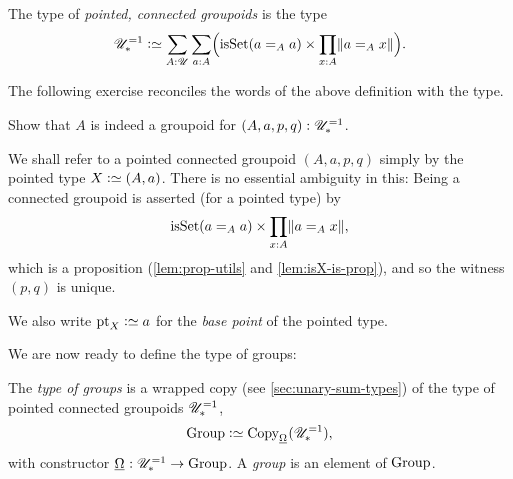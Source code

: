 \begin{definition}\label{def:pt-conn-groupoid}
  The type of \emph{pointed, connected groupoids} is the type
  \[
    \UUscone \defeq \sum_{A:\UU}\sum_{a:A} \Bigl(\isset(a=_Aa)
    \times \prod_{x:A}\Trunc{a=_Ax}\Bigr).
  \]
\end{definition}
The following exercise reconciles the words of the above definition with the type.
\begin{xca}\label{xca:defgroup}
  Show that $A$ is indeed a groupoid for $(A,a,p,q):{\mathscr{U}}_\ast^{=1}$.
\end{xca}
\begin{remark}
  We shall refer to a pointed connected groupoid $(A,a,p,q)$ simply
  by the pointed type $X \defeq (A,a)$.
  There is no essential ambiguity in this:
  Being a connected groupoid is asserted (for a pointed type) by
  \[
    \isset(a=_Aa)\times\prod_{x:A}\Trunc{a=_Ax},
  \]
  which is a proposition (\cref{lem:prop-utils} and \cref{lem:isX-is-prop}),
  and so the witness $(p,q)$ is unique.

  We also write $\pt_X \defeq a$ for the \emph{base point} of the pointed type.
\end{remark}

We are now ready to define the type of groups:

\begin{definition}\label{def:typegroup}
  The \emph{type of groups} is a wrapped copy (see \cref{sec:unary-sum-types})
  of the type of pointed connected groupoids ${\mathscr{U}}_\ast^{=1}$,
  \[
    \typegroup \defequi \Copy_{\mkgroup}(\UUscone),
  \]
  with constructor $\mkgroup : \UUscone \to \Group$.
  A \emph{group} is an element of $\mathrm{Group}$.
\end{definition}

